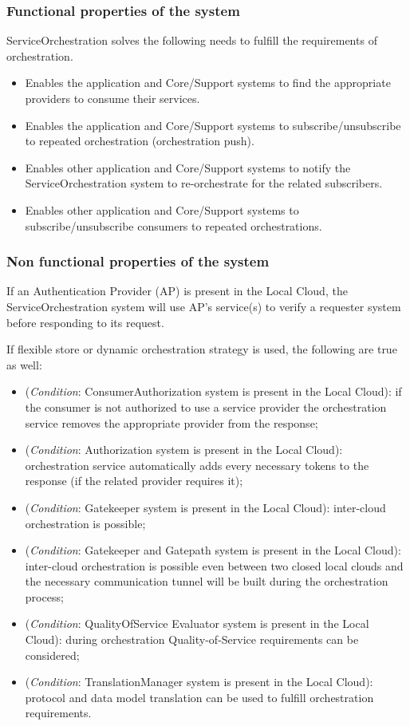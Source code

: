 \documentclass[a4paper]{arrowhead}
\begin{document}
\subsubsection {Functional properties of the system}
ServiceOrchestration solves the following needs to fulfill the requirements of orchestration.

\begin{itemize}
    \item Enables the application and Core/Support systems to find the appropriate providers to consume their services.
    \item Enables the application and Core/Support systems to subscribe/unsubscribe to repeated orchestration (orchestration push).
    \item Enables other application and Core/Support systems to notify the ServiceOrchestration system to re-orchestrate for the related subscribers.
    \item Enables other application and Core/Support systems to subscribe/unsubscribe consumers to repeated orchestrations.
\end{itemize}

\subsubsection {Non functional properties of the system}
If an Authentication Provider (AP) is present in the Local Cloud, the ServiceOrchestration system will use AP's service(s) to verify a requester system before responding to its request.  

If flexible store or dynamic orchestration strategy is used, the following are true as well:

\begin{itemize}
    \item (\textit{Condition}: ConsumerAuthorization system is present in the Local Cloud): if the consumer is not authorized to use a service provider the orchestration service removes the appropriate provider from the response;
    \item (\textit{Condition}: Authorization system is present in the Local Cloud): orchestration service automatically adds every necessary tokens to the response (if the related provider requires it);
    \item (\textit{Condition}: Gatekeeper system is present in the Local Cloud): inter-cloud orchestration is possible;
    \item (\textit{Condition}: Gatekeeper and Gatepath system is present in the Local Cloud): inter-cloud orchestration is possible even between two closed local clouds and the necessary communication tunnel will be built during the orchestration process;
    \item (\textit{Condition}: QualityOfService Evaluator system is present in the Local Cloud): during orchestration Quality-of-Service requirements can be considered;
    \item (\textit{Condition}: TranslationManager system is present in the Local Cloud): protocol and data model translation can be used to fulfill orchestration requirements.
\end{itemize}
\end{document}
